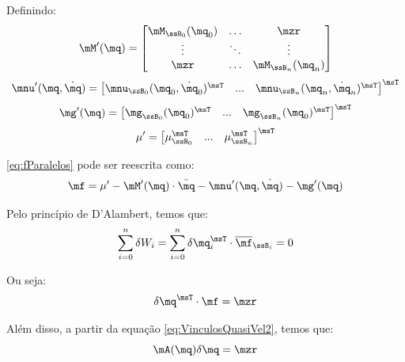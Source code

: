 \documentclass[]{politex}
\begin{document}
Definindo:
\begin{equation}
\mM'(\mq) =
\begin{bmatrix}
\mM_{\ssB_0}(\mq_0) & \ldots & \mzr\\
\vdots & \ddots & \vdots\\
\mzr &\ldots  & \mM_{\ssB_n}(\mq_n)
\end{bmatrix}
\end{equation}
\begin{equation}
\mnu'(\mq,\dot{\mq}) =
\begin{bmatrix}
\mnu_{\ssB_0}(\mq_0,\dot{\mq}_0)^\msT &
... &
\mnu_{\ssB_n}(\mq_n,\dot{\mq}_n)^\msT
\end{bmatrix}^\msT
\end{equation}
\begin{equation}
\mg'(\mq) =
\begin{bmatrix}
\mg_{\ssB_0}(\mq_0)^\msT &
... &
\mg_{\ssB_n}(\mq_0)^\msT  
\end{bmatrix}^\msT
\end{equation}
\begin{equation}
\mu' =
\begin{bmatrix}
\mu_{\ssB_0}^\msT &
... &
\mu_{\ssB_n}^\msT  
\end{bmatrix}^\msT
\end{equation}

\eqref{eq:fParalelos} pode ser reescrita como:
\begin{equation}
\mf = \mu' - \mM'(\mq) \cdot \ddot{\mq} - \mnu'(\mq,\dot{\mq}) - \mg'(\mq)
\end{equation}

Pelo princípio de D'Alambert, temos que:
\begin{equation}
\sum_{i=0}^n \delta W_i = \sum_{i=0}^n \delta \mq_i^\msT \cdot \overline{\mf}_{\ssB_i} = 0
\end{equation}

Ou seja:
\begin{equation} \label{eq:DAlambertParalelos}
\delta \mq^\msT \cdot \mf = \mzr
\end{equation}

Além disso, a partir da equação \eqref{eq:VinculosQuasiVel2}, temos que:
\begin{equation} \label{eq:Adeltaq}
\mA(\mq) \delta \mq = \mzr
\end{equation}
\end{document}
